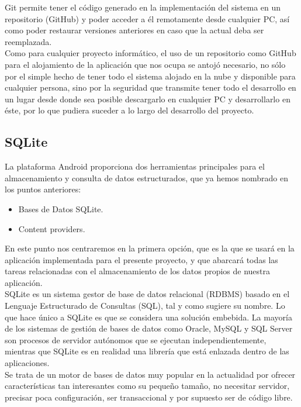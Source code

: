 Git permite tener el código generado en la implementación del sistema en un repositorio (GitHub) y poder acceder a él remotamente desde cualquier PC, así como poder restaurar versiones anteriores en caso que la actual deba ser reemplazada.\\

Como para cualquier proyecto informático, el uso de un repositorio como GitHub para el alojamiento de la aplicación que nos ocupa se antojó necesario, no sólo por el simple hecho de tener todo el sistema alojado en la nube y disponible para cualquier persona, sino por la seguridad que transmite tener todo el desarrollo en un lugar desde donde sea posible descargarlo en cualquier PC y desarrollarlo en éste, por lo que pudiera suceder a lo largo del desarrollo del proyecto.

\subsection{SQLite}

La plataforma Android proporciona dos herramientas principales para el almacenamiento y consulta de datos estructurados, que ya hemos nombrado en los puntos anteriores:

\begin{itemize}
\item Bases de Datos SQLite.
\item Content providers.
\end{itemize}

En este punto nos centraremos en la primera opción, que es la que se usará en la aplicación implementada para el presente proyecto, y que abarcará todas las tareas relacionadas con el almacenamiento de los datos propios de nuestra aplicación.\\

SQLite es un sistema gestor de base de datos relacional (RDBMS) basado en el Lenguaje Estructurado de Consultas (SQL), tal y como sugiere su nombre. Lo que hace único a SQLite es que se considera una solución embebida. La mayoría de los sistemas de gestión de bases de datos como Oracle, MySQL y SQL Server son procesos de servidor autónomos que se ejecutan independientemente, mientras que SQLite es en realidad una librería que está enlazada dentro de las aplicaciones.\\

Se trata de un motor de bases de datos muy popular en la actualidad por ofrecer características tan interesantes como su pequeño tamaño, no necesitar servidor, precisar poca configuración, ser transaccional y por supuesto ser de código libre.\\

